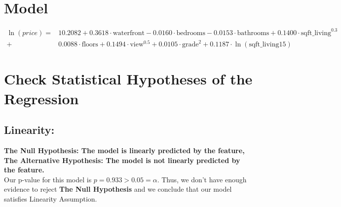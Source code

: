 \documentclass[10pt]{article}
\begin{document}
\section*{Model}
\begin{align*}
	 \ln(price) =& 10.2082 + 0.3618\cdot \text{waterfront} - 0.0160\cdot\text{bedrooms} -0.0153 \cdot\text{bathrooms} +0.1400\cdot\text{sqft\_living}^{0.3} \\ +& 0.0088 \cdot \text{floors}
	 + 0.1494\cdot\text{view}^{0.5}+ 0.0105\cdot\text{grade}^2+0.1187\cdot\ln\left(\text{sqft\_living15}\right)
\end{align*}
\section*{Check Statistical Hypotheses of the Regression}
\subsection*{Linearity:}
\textbf{The Null Hypothesis:  The model is linearly predicted by the feature,\\
The Alternative Hypothesis:  The model is not linearly predicted by the feature.}\\
Our p-value for this model is \(p=0.933 > 0.05 = \alpha\). Thus, we don't have enough evidence to reject \textbf{The Null Hypothesis} and  we conclude that our model satisfies Linearity Assumption.
\end{document}
